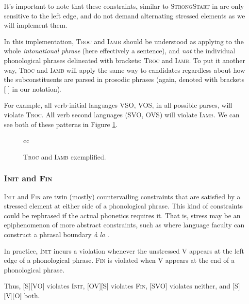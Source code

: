 \documentclass{article}
\newcommand{\iamb}{\textsc{Iamb}}
\newcommand{\finphi}{\textsc{Fin\textphi}}
\newcommand{\initphi}{\textsc{Init\textphi}}
\newcommand{\troc}{\textsc{Troc}}
\begin{document}
It's important to note that these constraints, similar to \textsc{StrongStart} in \textcite{selkirk11} are only sensitive to the left edge, and do not demand alternating stressed elements as we will implement them.

In this implementation, {\troc} and {\iamb} should be understood as applying to the whole \textit{intonational phrase} (here effectively a sentence), and \emph{not} the individual phonological phrases delineated with brackets: {\troc} and {\iamb}.
To put it another way, {\troc} and {\iamb} will apply the same way to candidates regardless about how the subconstituents are parsed in prosodic phrases (again, denoted with brackets [ ] in our notation).

For example, all verb-initial languages VSO, VOS, in all possible parses, will violate {\troc}.
All verb second languages (SVO, OVS) will violate {\iamb}.
We can see both of these patterns in Figure \ref{tramb}.

\begin{figure}
	\begin{center}
		\begin{tableau}{cc}
				\const{\troc}	\const{\iamb}
			\cand{[S][VO]}	\vio{}	\vio{*!}
			\cand{[SVO]}	\vio{}	\vio{*!}
			\cand{[VSO]}	\vio{*!}	\vio{}
			\cand[\Optimal]{[SOV]}	\vio{}	\vio{}
		\end{tableau}
	\end{center}
	\caption{\troc{} and \iamb{} exemplified.\label{tramb}}
\end{figure}

\subsubsection{{\initphi} and {\finphi}}

{\initphi} and {\finphi} are twin (mostly) countervailing constraints that are satisfied by a stressed element at either side of a phonological phrase.
This kind of constraints could be rephrased if the actual phonetics requires it.
That is, stress may be an epiphenomenon of more abstract constraints, such as where language faculty can construct a phrasal boundary \textit{\`a la} \textcite{richards10}.

In practice, {\initphi} incurs a violation whenever the unstressed V appears at the left edge of a phonological phrase.
{\finphi} is violated when V appears at the end of a phonological phrase.

Thus, [S][VO] violates {\initphi}, [OV][S] violates {\finphi}, [SVO] violates neither, and [S][V][O] both.
\end{document}

